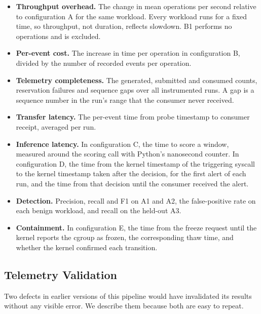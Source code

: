 \begin{itemize}
  \item \textbf{Throughput overhead.} The change in mean operations per second relative to configuration A for the same workload. Every workload runs for a fixed time, so throughput, not duration, reflects slowdown. B1 performs no operations and is excluded.
  \item \textbf{Per-event cost.} The increase in time per operation in configuration B, divided by the number of recorded events per operation.
  \item \textbf{Telemetry completeness.} The generated, submitted and consumed counts, reservation failures and sequence gaps over all instrumented runs. A gap is a sequence number in the run's range that the consumer never received.
  \item \textbf{Transfer latency.} The per-event time from probe timestamp to consumer receipt, averaged per run.
  \item \textbf{Inference latency.} In configuration C, the time to score a window, measured around the scoring call with Python's nanosecond counter. In configuration D, the time from the kernel timestamp of the triggering syscall to the kernel timestamp taken after the decision, for the first alert of each run, and the time from that decision until the consumer received the alert.
  \item \textbf{Detection.} Precision, recall and F1 on A1 and A2, the false-positive rate on each benign workload, and recall on the held-out A3.
  \item \textbf{Containment.} In configuration E, the time from the freeze request until the kernel reports the cgroup as frozen, the corresponding thaw time, and whether the kernel confirmed each transition.
\end{itemize}

\subsection{Telemetry Validation}
\label{sec:validation}

Two defects in earlier versions of this pipeline would have invalidated its results without any visible error. We describe them because both are easy to repeat.

